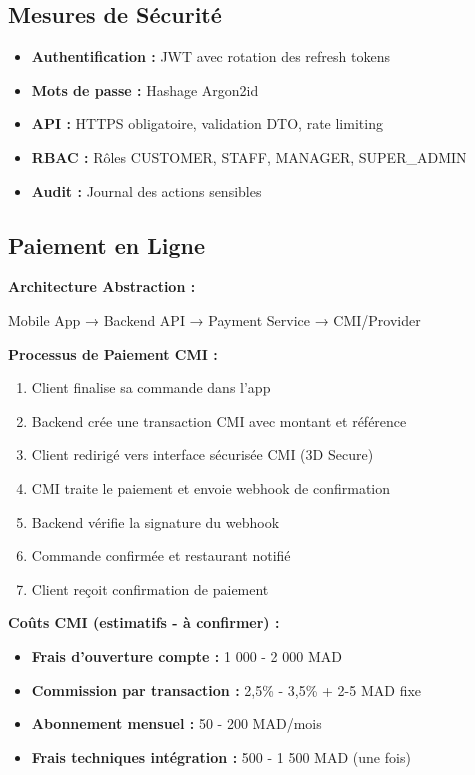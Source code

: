 \documentclass[11pt,a4paper]{article}
\begin{document}
\subsection{Mesures de Sécurité}

\begin{itemize}
    \item \textbf{Authentification :} JWT avec rotation des refresh tokens
    \item \textbf{Mots de passe :} Hashage Argon2id
    \item \textbf{API :} HTTPS obligatoire, validation DTO, rate limiting
    \item \textbf{RBAC :} Rôles CUSTOMER, STAFF, MANAGER, SUPER\_ADMIN
    \item \textbf{Audit :} Journal des actions sensibles
\end{itemize}

\subsection{Paiement en Ligne}

\textbf{Architecture Abstraction :}
\begin{center}
Mobile App → Backend API → Payment Service → CMI/Provider
\end{center}

\textbf{Processus de Paiement CMI :}
\begin{enumerate}
    \item Client finalise sa commande dans l'app
    \item Backend crée une transaction CMI avec montant et référence
    \item Client redirigé vers interface sécurisée CMI (3D Secure)
    \item CMI traite le paiement et envoie webhook de confirmation
    \item Backend vérifie la signature du webhook
    \item Commande confirmée et restaurant notifié
    \item Client reçoit confirmation de paiement
\end{enumerate}

\textbf{Coûts CMI (estimatifs - à confirmer) :}
\begin{itemize}
    \item \textbf{Frais d'ouverture compte :} 1 000 - 2 000 MAD
    \item \textbf{Commission par transaction :} 2,5\% - 3,5\% + 2-5 MAD fixe
    \item \textbf{Abonnement mensuel :} 50 - 200 MAD/mois
    \item \textbf{Frais techniques intégration :} 500 - 1 500 MAD (une fois)
\end{itemize}
\end{document}
